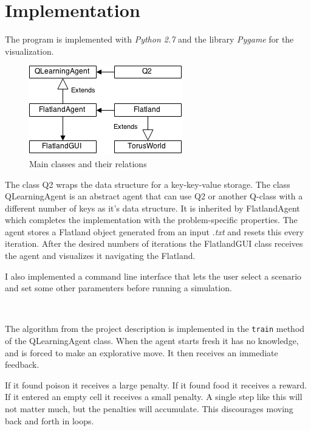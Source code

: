 \section*{Implementation}
The program is implemented with \textit{Python 2.7} and the library \textit{Pygame} for the visualization.

\begin{figure}[h]
    \centering
    \includegraphics[width=\linewidth]{img/QLearn.png}
    \caption{Main classes and their relations}
\end{figure}

The class Q2 wraps the data structure for a key-key-value storage.
The class QLearningAgent is an abstract agent that can use Q2
or another Q-class with a different number of keys as it's data structure.
It is inherited by FlatlandAgent which completes the implementation with the problem-specific properties.
The agent stores a Flatland object generated from an input \textit{.txt} and resets this every iteration.
After the desired numbers of iterations the FlatlandGUI class receives the agent
and visualizes it navigating the Flatland.

I also implemented a command line interface that lets the user select a scenario
and set some other paramenters before running a simulation.

~

The algorithm from the project description is implemented in the \texttt{train} method of the QLearningAgent class.
When the agent starts fresh it has no knowledge,
and is forced to make an explorative move.
It then receives an immediate feedback.

If it found poison it receives a large penalty.
If it found food it receives a reward.
If it entered an empty cell it receives a small penalty.
A single step like this will not matter much, but the penalties will accumulate.
This discourages moving back and forth in loops.

